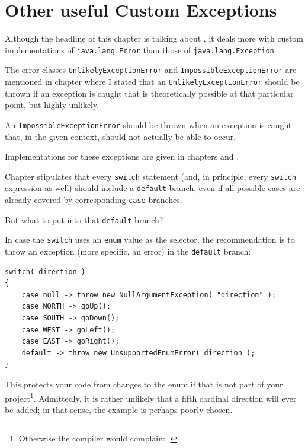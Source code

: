 \section{Other useful Custom Exceptions}\label{sec:UsefulCustomExceptions}
Although the headline of this chapter is talking about , it deals more with custom implementations of \lstinline|java.lang.Error| than those of \lstinline|java.lang.Exception|.

The error classes \lstinline|UnlikelyExceptionError| and \lstinline|ImpossibleExceptionError| are mentioned in chapter  where I stated that an \lstinline|UnlikelyExceptionError| should be thrown if an exception is caught that is theoretically possible at that particular point, but highly unlikely.

An \lstinline|ImpossibleExceptionError| should be thrown when an exception is caught that, in the given context, should not actually be able to occur.

Implementations for these exceptions are given in chapters  and .

\bigskip

Chapter  stipulates that every \lstinline|switch| statement (and, in principle, every \lstinline|switch| expression as well) should include a \lstinline|default| branch, even if all possible cases are already covered by corresponding \lstinline|case| branches.

But what to put into that \lstinline|default| branch?

In case the \lstinline|switch| uses an \lstinline|enum| value as the selector, the recommendation is to throw an exception (more specific, an error) in the \lstinline|default| branch:
\begin{lstlisting}
switch( direction )
{
    case null -> throw new NullArgumentException( "direction" );
    case NORTH -> goUp();
    case SOUTH -> goDown();
    case WEST -> goLeft();
    case EAST -> goRight();
    default -> throw new UnsupportedEnumError( direction );
}
\end{lstlisting}

This protects your code from changes to the enum if that is not part of your project\footnote{Otherwise the compiler would complain: .}. Admittedly, it is rather unlikely that a fifth cardinal direction will ever be added; in that sense, the example is perhaps poorly chosen.

